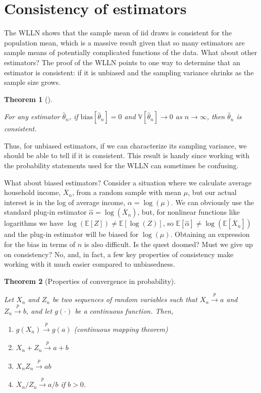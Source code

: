 \documentclass[
  letterpaper,
  DIV=11,
  numbers=noendperiod]{scrreprt}
\providecommand{\tightlist}{%
  \setlength{\itemsep}{0pt}\setlength{\parskip}{0pt}}\usepackage{longtable,booktabs,array}
\newcommand{\E}{\mathbb{E}}
\newcommand{\V}{\mathbb{V}}
\newcommand{\Xbar}{\overline{X}}
\newcommand{\inprob}{\overset{p}{\to}}
\theoremstyle{definition}
\theoremstyle{definition}
\theoremstyle{plain}
\newtheorem{theorem}{Theorem}[chapter]
\theoremstyle{remark}
\begin{document}
\hypertarget{consistency-of-estimators}{%
\section{Consistency of estimators}\label{consistency-of-estimators}}

The WLLN shows that the sample mean of iid draws is consistent for the
population mean, which is a massive result given that so many estimators
are sample means of potentially complicated functions of the data. What
about other estimators? The proof of the WLLN points to one way to
determine that an estimator is consistent: if it is unbiased and the
sampling variance shrinks as the sample size grows.

\begin{theorem}[]\protect\hypertarget{thm-consis}{}\label{thm-consis}

For any estimator \(\widehat{\theta}_n\), if
\(\text{bias}[\widehat{\theta}_n] = 0\) and
\(\V[\widehat{\theta}_n] \rightarrow 0\) as \(n\rightarrow \infty\),
then \(\widehat{\theta}_n\) is consistent.

\end{theorem}

Thus, for unbiased estimators, if we can characterize its sampling
variance, we should be able to tell if it is consistent. This result is
handy since working with the probability statements used for the WLLN
can sometimes be confusing.

What about biased estimators? Consider a situation where we calculate
average household income, \(\Xbar_n\), from a random sample with mean
\(\mu\), but our actual interest is in the log of average income,
\(\alpha = \log(\mu)\). We can obviously use the standard plug-in
estimator \(\widehat{\alpha} = \log(\Xbar_n)\), but, for nonlinear
functions like logarithms we have
\(\log\left(\E[Z]\right) \neq \E[\log(Z)]\), so
\(\E[\widehat{\alpha}] \neq \log(\E[\Xbar_n])\) and the plug-in
estimator will be biased for \(\log(\mu)\). Obtaining an expression for
the bias in terms of \(n\) is also difficult. Is the quest doomed? Must
we give up on consistency? No, and, in fact, a few key properties of
consistency make working with it much easier compared to unbiasedness.

\begin{theorem}[Properties of convergence in
probability]\protect\hypertarget{thm-inprob-properties}{}\label{thm-inprob-properties}

Let \(X_n\) and \(Z_n\) be two sequences of random variables such that
\(X_n \inprob a\) and \(Z_n \inprob b\), and let \(g(\cdot)\) be a
continuous function. Then,

\begin{enumerate}
\def\labelenumi{\arabic{enumi}.}
\tightlist
\item
  \(g(X_n) \inprob g(a)\) (continuous mapping theorem)
\item
  \(X_n + Z_n \inprob a + b\)
\item
  \(X_nZ_n \inprob ab\)
\item
  \(X_n/Z_n \inprob a/b\) if \(b > 0\).
\end{enumerate}

\end{theorem}
\end{document}
